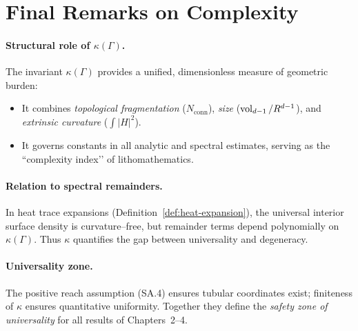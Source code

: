 \bigskip


\section{Final Remarks on Complexity}
\label{sec:final-remarks}

\paragraph{Structural role of $\kappa(\Gamma)$.}
The invariant $\kappa(\Gamma)$ provides a unified, dimensionless measure of geometric burden:
\begin{itemize}
  \item It combines \emph{topological fragmentation} ($N_{\mathrm{conn}}$), \emph{size} ($\operatorname{vol}_{d-1}/R^{d-1}$), and \emph{extrinsic curvature} ($\int|H|^2$).
  \item It governs constants in all analytic and spectral estimates, serving as the ``complexity index’’ of lithomathematics.
\end{itemize}

\paragraph{Relation to spectral remainders.}
In heat trace expansions (Definition~\ref{def:heat-expansion}), the universal interior surface density is curvature–free, but remainder terms depend polynomially on $\kappa(\Gamma)$.
Thus $\kappa$ quantifies the gap between universality and degeneracy.

\paragraph{Universality zone.}
The positive reach assumption (SA.4) ensures tubular coordinates exist; finiteness of $\kappa$ ensures quantitative uniformity.  
Together they define the \emph{safety zone of universality} for all results of Chapters~2–4.

